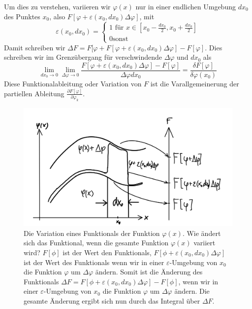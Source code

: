 Um dies zu verstehen, variieren wir $\varphi(x)$ nur in einer endlichen
Umgebung $dx_0$ des Punktes $x_0$, also
$F[\varphi+\varepsilon(x_0,dx_0)\Delta\varphi]$, mit 
  \begin{equation}\label{eq:umgebungeps}
    \varepsilon(x_0,dx_0)=\left\{\begin{matrix}1\text{ für
    }x\in[x_0-\frac{dx_0}{2},x_0+\frac{dx_0}{2}]\\ 0 \text{
    sonst}\end{matrix}\right.
  \end{equation}
Damit schreiben wir $\Delta
F=F[\varphi+F[\varphi+\varepsilon(x_0,dx_0)\Delta\varphi]-F[\varphi]$. Dies
schreiben wir im Grenzübergang für verschwindende $\Delta\varphi$ und $dx_0$
als
\begin{equation}\label{eq:Variationsableitung}
  \lim_{dx_0\rightarrow 0}\lim_{\Delta\varphi\rightarrow 0}
      \frac{F[\varphi+\varepsilon(x_0,dx_0)\Delta\varphi]-F[\varphi]}{\Delta\varphi dx_0}
    =\frac{\delta F[\varphi]}{\delta\varphi(x_0)}
\end{equation} 
Diese Funktionalableitung oder Variation von $F$ ist die Varallgemeinerung der
partiellen Ableitung $\frac{\partial F[\varphi]}{\partial\varphi_k}$.
%
\begin{figure}[!h] 
 \begin{center}
  \includegraphics[height=0.4\textwidth]{fig/Variation.jpeg}
  \caption{Die Variation eines Funktionals der Funktion $\varphi(x)$. Wie
    ändert sich das Funktional, wenn die gesamte Funktion $\varphi(x)$ variiert
    wird? $F[\phi]$ ist der Wert den Funktionals,
    $F[\phi+\varepsilon(x_0,dx_0)\Delta\varphi]$ ist der Wert des Funktionals
    wenn wir in einer $\varepsilon$-Umgebung von $x_0$ die Funktion $\varphi$
    um $\Delta\varphi$ ändern. Somit ist die Änderung des Funktionals $\Delta
    F=F[\phi+\varepsilon(x_0,dx_0)\Delta\varphi]-F[\phi]$, wenn wir in einer
    $\varepsilon$-Umgebung von $x_0$ die Funktion $\varphi$ um $\Delta\varphi$
    ändern. Die gesamte Änderung ergibt sich nun durch das Integral über $\Delta
    F$.\label{fig:variation}}
 \end{center}
\end{figure}
